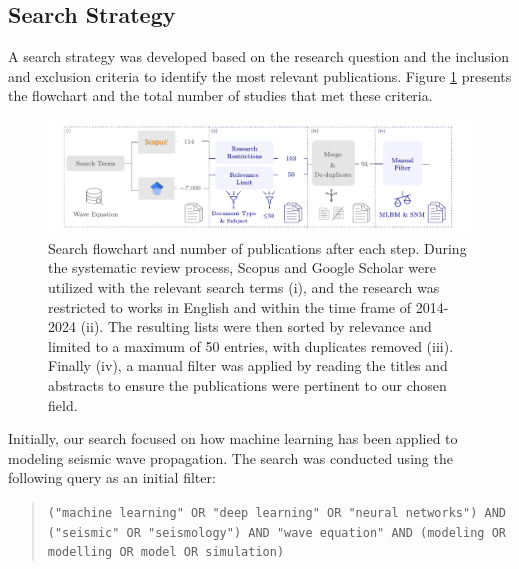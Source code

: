\documentclass[11pt,twoside]{article}
\begin{document}
\subsection*{Search Strategy}

A search strategy was developed based on the research question and the inclusion and exclusion criteria to 
identify the most relevant publications. Figure \ref{fig:scheme_systematic_review} presents the flowchart and 
the total number of studies that met these criteria.

\begin{figure}[h]
    \includegraphics[width=1.0\textwidth]{figs/scheme_systematic_review.pdf}
\caption{Search flowchart and number of publications after each step. During the systematic review process, 
Scopus and Google Scholar were utilized with the relevant search terms (i), and the research was restricted to works 
in English and within the time frame of 2014-2024 (ii). The resulting lists were then sorted by relevance and limited 
to a maximum of 50 entries, with duplicates removed (iii). Finally (iv), a manual filter was applied by reading the 
titles and abstracts to ensure the publications were pertinent to our chosen field.}\label{fig:scheme_systematic_review}
\end{figure}

Initially, our search focused on how machine learning has been applied to modeling seismic wave propagation. 
The search was conducted using the following query as an initial filter:

\vspace*{2mm}

\begin{tcolorbox}[colback=gray!20, colframe=gray!20, sharp corners]
\begin{quote}
\noindent\texttt{("machine learning" OR "deep learning" OR "neural networks") AND ("seismic" OR 
"seismology") AND "wave equation" AND (modeling OR modelling OR model OR simulation)}
\end{quote}
\end{tcolorbox}

\vspace*{2mm}
\end{document}
